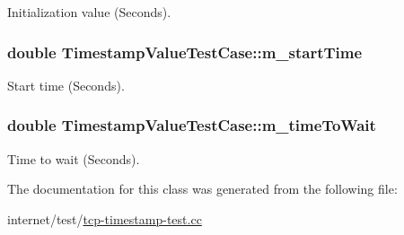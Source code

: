 Initialization value (Seconds). 

\subsubsection[{\texorpdfstring{m\+\_\+start\+Time}{m_startTime}}]{\setlength{\rightskip}{0pt plus 5cm}double Timestamp\+Value\+Test\+Case\+::m\+\_\+start\+Time\hspace{0.3cm}{\ttfamily [private]}}\hypertarget{classTimestampValueTestCase_aad30710173209e76bbbaf385bf8b9834}{}\label{classTimestampValueTestCase_aad30710173209e76bbbaf385bf8b9834}


Start time (Seconds). 

\subsubsection[{\texorpdfstring{m\+\_\+time\+To\+Wait}{m_timeToWait}}]{\setlength{\rightskip}{0pt plus 5cm}double Timestamp\+Value\+Test\+Case\+::m\+\_\+time\+To\+Wait\hspace{0.3cm}{\ttfamily [private]}}\hypertarget{classTimestampValueTestCase_a1e4047595d9d3487a04beed4d1d8ea4f}{}\label{classTimestampValueTestCase_a1e4047595d9d3487a04beed4d1d8ea4f}


Time to wait (Seconds). 



The documentation for this class was generated from the following file\+:\begin{DoxyCompactItemize}
\item 
internet/test/\hyperlink{tcp-timestamp-test_8cc}{tcp-\/timestamp-\/test.\+cc}\end{DoxyCompactItemize}
